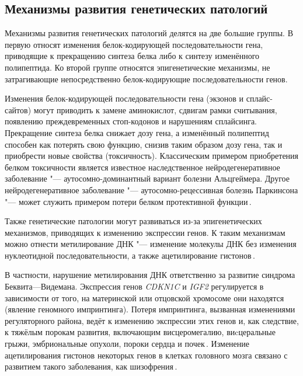 \documentclass[a4paper,14pt]{extarticle}
\newcommand{\genename}[1]{\textit{#1}}
\begin{document}
\subsection{Механизмы развития генетических патологий}

Механизмы развития генетических патологий делятся на две большие группы.
В первую относят изменения белок-кодирующей последовательности гена, приводящие к прекращению синтеза белка либо к синтезу изменённого полипептида.
Ко второй группе относятся эпигенетические механизмы, не затрагивающие непосредственно белок-кодирующие последовательности генов.

Изменения белок-кодирующей последовательности гена (экзонов и сплайс-сайтов) могут приводить к замене аминокислот, сдвигам рамки считывания, появлению преждевременных стоп-кодонов и нарушениям сплайсинга.
Прекращение синтеза белка снижает дозу гена, а изменённый полипептид способен как потерять свою функцию, снизив таким образом дозу гена, так и приобрести новые свойства (токсичность).
Классическим примером приобретения белком токсичности является известное наследственное нейродегенеративное заболевание "--- аутосомно-доминантный вариант болезни Альцгеймера.
Другое нейродегенеративное заболевание "--- аутосомно-рецессивная болезнь Паркинсона "--- может служить примером потери белком протективной функции\,\citep{Winklhofer_2008}.

Также генетические патологии могут развиваться из-за эпигенетических механизмов, приводящих к изменению экспрессии генов.
К таким механизмам можно отнести метилирование ДНК "--- изменение молекулы ДНК без изменения нуклеотидной последовательности, а также ацетилирование гистонов\,\citep{Handy_2011}.

В частности, нарушение метилирования ДНК ответственно за развитие синдрома Беквита---Видемана.
Экспрессия генов \genename{CDKN1C} и \genename{IGF2} регулируется в зависимости от того, на материнской или отцовской хромосоме они находятся (явление геномного импринтинга).
Потеря импринтинга, вызванная изменениями регуляторного района, ведёт к изменению экспрессии этих генов и, как следствие, к тяжёлым порокам развития, включающим висцеромегалию, виcцеральные грыжи, эмбриональные опухоли, пороки сердца и почек\,\citep{Jin_2018}.
Изменение ацетилирования гистонов некоторых генов в клетках головного мозга связано с развитием такого заболевания, как шизофрения\,\citep{Tang_2011}.
\end{document}
